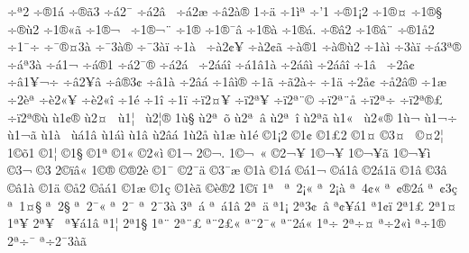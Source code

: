 {^^f7^^ad^^aa2
^^f7^^ad^^ae1^^e1
^^f7^^ad^^ae^^e33
^^f7^^ad^^e12^^af
^^f7^^ad^^e12^^e2^^a0
^^f7^^ad^^e12^^e6
^^f7^^ad^^e22^^e0^^ae
1^^f7^^ad^^e4
^^f71^^ad^^ec^^aa
^^f7^^ad'1
^^f7^^ae1^^a12
^^f71^^ae^^a4
^^f71^^ae^^a7
^^f7^^ae^^f92
^^f71^^ae^^ab^^e3
^^f71^^ae^^ac^^a0
^^f71^^ae^^ac^^a8
^^f71^^ae^^ad
^^f71^^ae^^af^^e2
^^f71^^ae^^e0
^^f71^^ae^^e1.
^^f7^^ae^^e22
^^f71^^ae^^e2^^a8
^^f7^^ae1^^e52
^^f71^^af^^f7
^^f7^^af^^ae^^a43^^e0
^^f7^^af3^^e0^^ae
^^f7^^af3^^e0^^ef
^^f71^^e0^^a0
^^f7^^e02^^a2^^a5
^^f7^^e02^^a2^^e3
^^f7^^e0^^ae1
^^f7^^e0^^ae^^f92
^^f71^^e0^^ec
^^f73^^e0^^ef
^^f7^^e13^^aa^^ae
^^f7^^e1^^aa3^^e0
^^f7^^e11^^ac
^^f7^^e1^^ae1
^^f7^^e12^^af^^ae
^^f7^^e12^^e1^^a0
^^f72^^e1^^e1^^ee
^^f7^^e11^^e21^^e0
^^f72^^e1^^e2^^ec
^^f72^^e1^^e2^^ee
^^f71^^e2^^a0
^^f72^^e2^^a2
^^f7^^e21^^a5^^ac^^f7
^^f7^^e22^^ad^^a5^^e2
^^f7^^e2^^ae3^^a2
^^f7^^e21^^e0
^^f72^^e2^^e1
^^f71^^e2^^ec^^ae
^^f71^^e3
^^f7^^e32^^e0^^f7
^^f71^^e4
^^f72^^e5^^a2
^^f7^^e52^^e2^^ae
^^f71^^e6
^^f72^^e8^^aa
^^f7^^e82^^ab^^a5
^^f7^^e82^^ab^^ee
^^f71^^e9
^^f71^^ee
^^f71^^ef
^^f7^^ef2^^a4^^a5
^^f7^^ef2^^aa^^a5
^^f7^^ef2^^aa^^a8^^a9
^^f7^^ef2^^aa^^a8^^e5
^^f7^^ef2^^aa^^f7
^^f7^^ef2^^aa^^ae^^a3
^^f7^^ef2^^aa^^ae^^f9
^^f91^^a2^^ae
^^f92^^a4^^a0^^ad
^^f91^^a6^^a0
^^f92^^a6^^ae
1^^f9^^a7
^^f92^^aa^^a0^^f5
^^f92^^aa^^a0^^e2
^^f92^^aa^^a0^^ee
^^f92^^aa^^e3
^^f91^^ab^^a0
^^f92^^ab^^ae
1^^f9^^ac
^^f91^^ac^^f7
^^f91^^ac^^e3
^^f91^^e0^^a0
^^f9^^e11^^e2
^^f91^^e1^^ec
^^f91^^e2
^^f92^^e2^^e1
1^^f92^^e5
^^f91^^e6
^^f91^^e9
^^a91^^a12
^^a91^^a2
^^a91^^a32
^^a91^^a4
^^a93^^a4^^a0
^^a9^^a42^^a6
1^^a9^^f51
^^a91^^a6
^^a91^^a7
^^a91^^aa
^^a91^^ab
^^a92^^ab^^ec
^^a91^^ac
2^^a9^^ac.
1^^a9^^ac^^a0^^ab
^^a92^^ac^^a5^^ad
1^^a9^^ac^^a5^^ad^^ad
1^^a9^^ac^^a5^^ad^^e3
1^^a9^^ac^^a5^^ad^^ec
^^a93^^ac^^ad
^^a93^^ad
2^^a9^^ad^^ef^^e2^^ab
1^^a9^^ae
^^a9^^ae2^^e8
^^a91^^af
^^a92^^af^^e4
^^a93^^af^^e6
^^a91^^e0
^^a91^^e1
^^a9^^e11^^ac
^^a9^^e11^^e2
^^a92^^e11^^e4
^^a91^^e2
^^a93^^e2^^a0
^^a9^^e21^^e0
^^a91^^e4
^^a9^^e52
^^a9^^e5^^e11
^^a91^^e6
^^a91^^e7
^^a91^^e8^^ad^^e3
^^a9^^e8^^ae2
1^^a9^^ef
1^^aa^^a0
^^aa^^a02^^a1^^ab
^^aa^^a02^^a1^^e0
^^aa^^a04^^a2^^ab
^^aa^^a0^^a2^^ae2^^e1
^^aa^^a0^^a23^^e7
^^aa^^a01^^a4^^a7
^^aa^^a02^^a7^^ad
^^aa^^a02^^af^^ab
^^aa^^a02^^af^^ad
^^aa^^a02^^af3^^e0
3^^aa^^a0^^e1
^^aa^^a0^^e11^^e2
2^^aa^^a0^^e4
^^aa1^^a1
2^^aa3^^a2^^a0^^e2
^^aa^^a2^^a5^^e11
^^aa1^^a2^^ef
2^^aa1^^a3
2^^aa1^^a4
1^^aa^^a5
2^^aa^^a5^^a0
^^aa^^a5^^e11^^e2
^^aa1^^a6
2^^aa1^^a7
1^^aa^^a8
2^^aa^^a8^^a3
^^aa^^a82^^a3^^ab
^^aa^^a82^^af^^ab
^^aa^^a82^^e1^^ab
1^^aa^^f7
2^^aa^^f7^^a4
^^aa^^f72^^ab^^ec
^^aa^^f71^^ae
2^^aa^^f7^^af
^^aa^^f72^^af3^^e0^^e3
}
